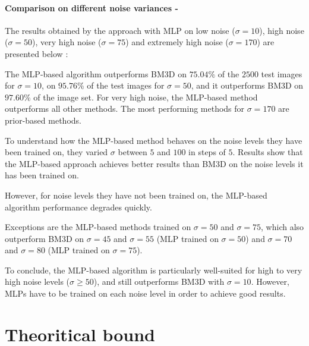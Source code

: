 \documentclass[10pt,a4paper]{article}
\newcommand{\svs}{\vspace{9pt}}
\newcommand{\ourparagraph}[1]{\paragraph{#1}}
\begin{document}
\ourparagraph{Comparison on different noise variances -}{
The results obtained by the approach with MLP on low noise ($\sigma = 10$), high noise ($\sigma = 50$),
very high noise ($\sigma = 75$) and extremely high noise ($\sigma = 170$) are presented below :

\svs

The MLP-based algorithm outperforms BM3D on $75.04\%$ of the $2500$ test images for $\sigma=10$, on $95.76\%$ of the test images for $\sigma=50$, and it outperforms BM3D on $97.60\%$ of the image set. For very high noise, the MLP-based method outperforms all other methods. The most performing methods for $\sigma=170$ are prior-based methods.

\svs 

To understand how the MLP-based method behaves on the noise levels they have been trained on, they varied $\sigma$ between $5$ and $100$ in steps of $5$.
Results show that the MLP-based approach achieves better results than BM3D on the noise levels it has been trained on.

\svs
However, for noise levels they have not been
trained on, the MLP-based algorithm performance degrades quickly.

Exceptions are the MLP-based methods trained on $\sigma = 50$ and $\sigma = 75$, which also outperform BM3D on $\sigma = 45$ and $\sigma = 55$ (MLP trained on $\sigma = 50$) and $\sigma = 70$ and $\sigma = 80$ (MLP trained on $\sigma = 75$).

\svs

To conclude, the MLP-based algorithm is particularly well-suited for high to very high noise
levels ($\sigma \geq 50$), and still outperforms BM3D with
$\sigma = 10$. However, MLPs have to be trained on each noise level in order to achieve good results.}

\section{Theoritical bound}
\end{document}
